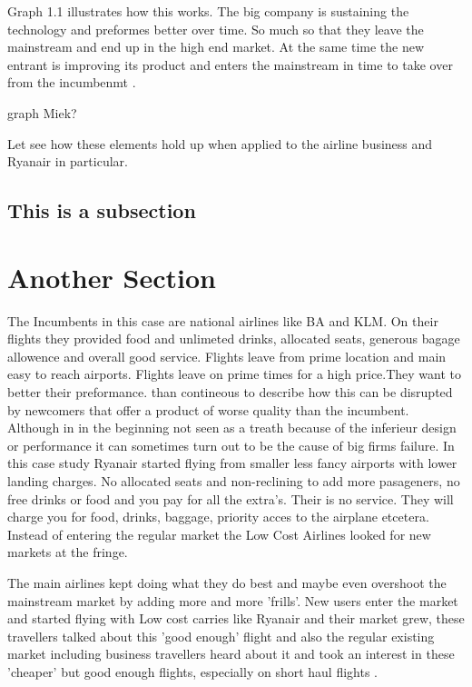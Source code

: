 \documentclass[a4paper, 11pt]{article}
\begin{document}
Graph 1.1 illustrates how this works. The big company is sustaining the technology and preformes better over time. So much so that they leave the mainstream and end up in the high end market. At the same time the new entrant is improving its product and enters the mainstream in time to take over from the incumbenmt \cite{Christensen97}.

graph Miek?


Let see how these elements hold up when applied to the airline business and Ryanair in particular.


\subsection{This is a subsection}
\label{sec:this-is-a-section}

\section{Another Section}


The Incumbents in this case are national airlines like BA and KLM. On their flights they provided food and unlimeted drinks, allocated seats, generous bagage allowence and overall good service. Flights leave from prime location and main easy to reach airports. Flights leave on prime times for a high price.They want to better their preformance. \cite{Christensen97} than contineous to describe how this can be disrupted by newcomers that offer a product of worse quality than the incumbent. Although in in the beginning not seen as a treath because of the inferieur design or performance it can sometimes turn out to be the cause of big firms failure. In this case study Ryanair started flying from smaller less fancy airports with lower landing charges. No allocated seats and non-reclining to add more pasageners, no free drinks or food and you pay for all the extra's. Their is no service. They will charge you for food, drinks, baggage, priority acces to the airplane etcetera. 
Instead of entering the regular market the Low Cost Airlines looked for new markets at the fringe. 

The main airlines kept doing what they do best and maybe even overshoot the mainstream market by adding more and more 'frills'. New users enter the market and started flying with Low cost carries like Ryanair and their market grew, these travellers talked about this 'good enough' flight and also the regular existing market including business travellers heard about it and took an interest in these 'cheaper' but good enough flights, especially on short haul flights \citep{TiddBessant}.
\end{document}
